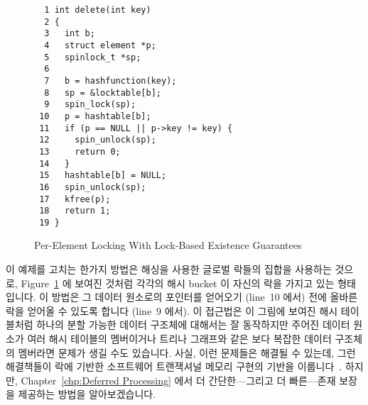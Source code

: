 \begin{figure}[tbp]
{ \scriptsize
\begin{verbatim}
  1 int delete(int key)
  2 {
  3   int b;
  4   struct element *p;
  5   spinlock_t *sp;
  6
  7   b = hashfunction(key);
  8   sp = &locktable[b];
  9   spin_lock(sp);
 10   p = hashtable[b];
 11   if (p == NULL || p->key != key) {
 12     spin_unlock(sp);
 13     return 0;
 14   }
 15   hashtable[b] = NULL;
 16   spin_unlock(sp);
 17   kfree(p);
 18   return 1;
 19 }
\end{verbatim}
}
\caption{Per-Element Locking With Lock-Based Existence Guarantees}
\label{fig:locking:Per-Element Locking With Lock-Based Existence Guarantees}
\end{figure}

이 예제를 고치는 한가지 방법은 해싱을 사용한 글로벌 락들의 집합을 사용하는
것으로,
Figure~\ref{fig:locking:Per-Element Locking With Lock-Based Existence Guarantees}
에 보여진 것처럼 각각의 해시 bucket 이 자신의 락을 가지고 있는 형태입니다.
이 방법은 그 데이터 원소로의 포인터를 얻어오기 (line~10 에서) 전에 올바른 락을
얻어올 수 있도록 합니다 (line~9 에서).
이 접근법은 이 그림에 보여진 해시 테이블처럼 하나의 분할 가능한 데이터 구조체에
대해서는 잘 동작하지만 주어진 데이터 원소가 여러 해시 테이블의 멤버이거나
트리나 그래프와 같은 보다 복잡한 데이터 구조체의 멤버라면 문제가 생길 수도
있습니다.
사실, 이런 문제들은 해결될 수 있는데, 그런 해결책들이 락에 기반한 소프트웨어
트랜잭셔널 메모리 구현의 기반을 이룹니다~\cite{Shavit95,DaveDice2006DISC}.
하지만, Chapter~\ref{chp:Deferred Processing} 에서 더 간단한---그리고 더
빠른---존재 보장을 제공하는 방법을 알아보겠습니다.
\iffalse

One way to fix this example is to use a hashed set of global locks, so
that each hash bucket has its own lock, as shown in
Figure~\ref{fig:locking:Per-Element Locking With Lock-Based Existence Guarantees}.
This approach allows acquiring the proper lock (on line~9) before
gaining a pointer to the data element (on line~10).
Although this approach works quite well for elements contained in a
single partitionable data structure such as the hash table shown in the
figure, it can be problematic if a given data element can be a member
of multiple hash tables or given more-complex data structures such
as trees or graphs.
These problems can be solved, in fact, such solutions form the basis
of lock-based software transactional memory
implementations~\cite{Shavit95,DaveDice2006DISC}.
However,
Chapter~\ref{chp:Deferred Processing}
describes simpler---and faster---ways of providing existence guarantees.
\fi
